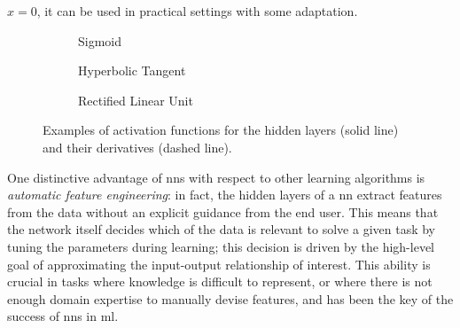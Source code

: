 $x = 0$, it can be used in practical settings with some adaptation.
\begin{figure*}[h!]
    \begin{subfigure}[b]{0.32\linewidth}
        \centering
        \resizebox{.8\textwidth}{!}{}
        \caption{Sigmoid}
        \label{fig:sigmoid}
    \end{subfigure}
    \begin{subfigure}[b]{0.32\linewidth}
        \centering
        \resizebox{.8\textwidth}{!}{}
        \caption{Hyperbolic Tangent}
        \label{fig:hyptan}
    \end{subfigure}
    \begin{subfigure}[b]{0.32\linewidth}
        \centering
        \resizebox{.8\textwidth}{!}{}
        \caption{Rectified Linear Unit}
        \label{fig:relu}
    \end{subfigure}
    \caption{Examples of activation functions for the hidden layers (solid line) and their derivatives (dashed line).}
    \label{fig:activations}
\end{figure*}
One distinctive advantage of \glspl{nn} with respect to other learning algorithms is \emph{automatic feature engineering}: in fact, the hidden layers of a \gls{nn} extract features from the data without an explicit guidance from the end user. This means that the network itself decides which  of the data is relevant to solve a given task by tuning the parameters during learning; this decision is driven by the high-level goal of approximating the input-output relationship of interest. This ability is crucial in tasks where knowledge is difficult to represent, or where there is not enough domain expertise to manually devise features, and has been the key of the success of \glspl{nn} in \gls{ml}.


